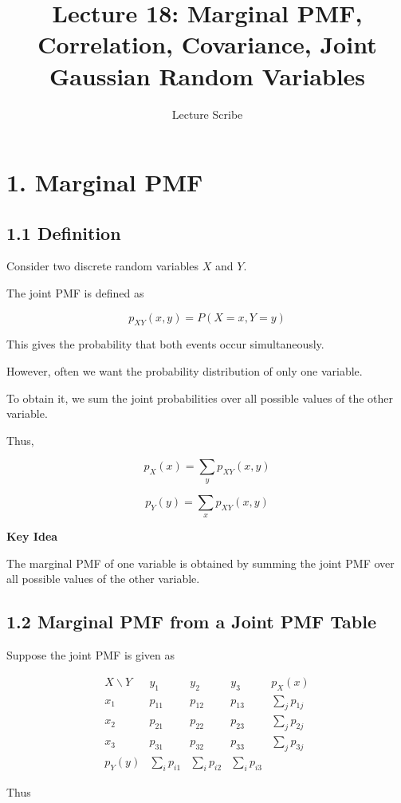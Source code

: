 \documentclass[12pt]{article}
\title{\textbf{Lecture 18: Marginal PMF, Correlation, Covariance, Joint Gaussian Random Variables}}
\author{Lecture Scribe}
\date{}
\begin{document}
\maketitle

\section*{1. Marginal PMF}

\subsection*{1.1 Definition}

Consider two discrete random variables $X$ and $Y$.

The joint PMF is defined as

\[
p_{XY}(x,y) = P(X=x, Y=y)
\]

This gives the probability that both events occur simultaneously.

However, often we want the probability distribution of only one variable.

To obtain it, we sum the joint probabilities over all possible values of the other variable.

Thus,

\[
p_X(x) = \sum_{y} p_{XY}(x,y)
\]

\[
p_Y(y) = \sum_{x} p_{XY}(x,y)
\]

\textbf{Key Idea}

The marginal PMF of one variable is obtained by summing the joint PMF over all possible values of the other variable.

\subsection*{1.2 Marginal PMF from a Joint PMF Table}

Suppose the joint PMF is given as

\[
\begin{array}{c|ccc|c}
X \backslash Y & y_1 & y_2 & y_3 & p_X(x) \\
\hline
x_1 & p_{11} & p_{12} & p_{13} & \sum_j p_{1j} \\
x_2 & p_{21} & p_{22} & p_{23} & \sum_j p_{2j} \\
x_3 & p_{31} & p_{32} & p_{33} & \sum_j p_{3j} \\
\hline
p_Y(y) & \sum_i p_{i1} & \sum_i p_{i2} & \sum_i p_{i3} &
\end{array}
\]

Thus
\end{document}
